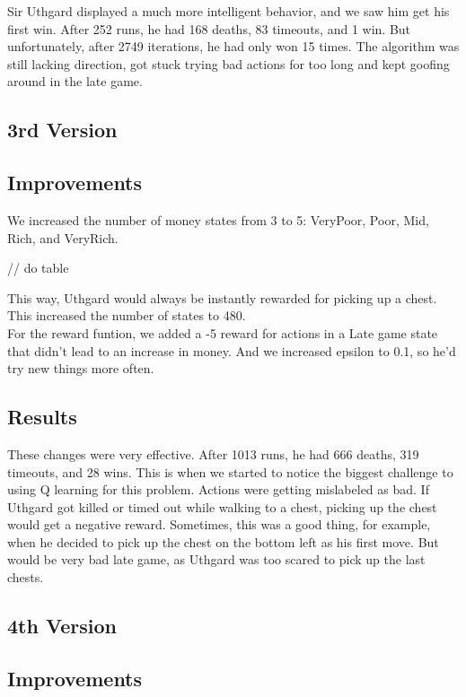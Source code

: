 \documentclass{article}
\begin{document}
  Sir Uthgard displayed a much more intelligent behavior, and we saw him get his first win. After 252 runs, he had 168 deaths, 83 timeouts, and 1 win. 
  But unfortunately, after 2749 iterations, he had only won 15 times. The algorithm was still lacking direction, got stuck trying bad actions for too long and kept goofing around in the late game.

  \subsection{3rd Version}

  \subsection{Improvements}

  We increased the number of money states from 3 to 5: VeryPoor, Poor, Mid, Rich, and VeryRich. 
  
  // do table
  
  This way, Uthgard would always be instantly rewarded for picking up a chest. This increased the number of states to 480. \\
  For the reward funtion, we added a -5 reward for actions in a Late game state that didn't lead to an increase in money. And we increased epsilon to 0.1, so he'd try new things more often.

  \subsection{Results}

  These changes were very effective. After 1013 runs, he had 666 deaths, 319 timeouts, and 28 wins. This is when we started to notice the biggest challenge to using Q learning for this problem. 
  Actions were getting mislabeled as bad. If Uthgard got killed or timed out while walking to a chest, picking up the chest would get a negative reward. 
  Sometimes, this was a good thing, for example, when he decided to pick up the chest on the bottom left as his first move. But would be very bad late game, as Uthgard was too scared to pick up the last chests.

  \subsection{4th Version}

  \subsection{Improvements}
\end{document}
